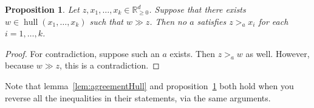 \documentclass[12pt]{article}
\newtheorem{proposition}[theorem]{Proposition}
\newcommand{\Rgz}{\mathbb{R}_{\ge 0}}
\DeclareMathOperator*{\hull}{hull}
\newcommand{\1}[1]{\mathds{1}[{#1}]}
\begin{document}
    \begin{proposition}\label{prop:domHull}
      Let $z,x_1,\ldots,x_k \in \Rgz^d$.
      Suppose that there exists $w\in \hull(x_1,\ldots,x_k)$
      such that $w \gg z$.
      Then no $a$ satisfies $z >_a x_i$ for each $i=1,\ldots, k$.
    \end{proposition}
    \begin{proof}
      For contradiction, suppose such an $a$ exists.
      Then $z >_a w$ as well. However, because $w \gg z$,
      this is a contradiction.
    \end{proof}
    Note that lemma~\ref{lem:agreementHull} and proposition~\ref{prop:domHull}
    both hold when you reverse all the inequalities in their statements,
    via the same arguments.
\end{document}
